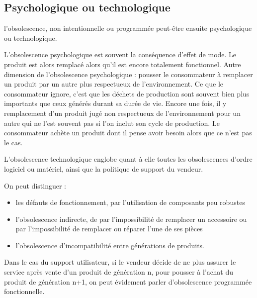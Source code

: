 \subsection{Psychologique ou technologique}

l’obsolescence, non intentionnelle ou programmée peut-être ensuite psychologique ou technologique. 

\bigbreak
L’obsolescence psychologique est souvent la conséquence d’effet de mode. Le produit est alors remplacé alors qu’il est encore totalement fonctionnel. Autre dimension de l’obsolescence psychologique : pousser le consommateur à remplacer un produit par un autre plus respectueux de l’environnement.
Ce que le consommateur ignore, c’est que les déchets de production sont souvent bien plus importants que ceux générés durant sa durée de vie. Encore une fois, il y remplacement d’un produit jugé non respectueux de l’environnement pour un autre qui ne l’est souvent pas si l’on inclut son cycle de production. Le consommateur achète un produit dont il pense avoir besoin alors que ce n'est pas le cas.

\medbreak
L’obsolescence technologique englobe quant à elle toutes les obsolescences d’ordre logiciel ou matériel, ainsi que la politique de support du vendeur. 

On peut distinguer :
\begin{itemize}
  \item les défauts de fonctionnement, par l’utilisation de composants peu robustes
  \item l’obsolescence indirecte, de par l'impossibilité de remplacer un accessoire ou par l’impossibilité de remplacer ou réparer l’une de ses pièces
  \item l’obsolescence d’incompatibilité entre générations de produits.
\end{itemize}


\bigbreak
Dans le cas du support utilisateur, si le vendeur décide de ne plus assurer le service après vente d’un produit de génération n, pour pousser à l’achat du produit de génération n+1, on peut évidement parler d'obsolescence programmée fonctionnelle.
